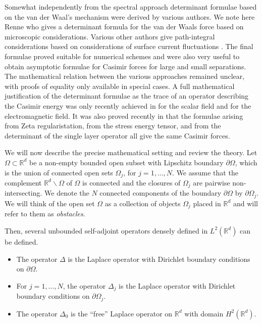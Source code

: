 Somewhat independently from the spectral approach determinant formulae based on the van der Waal's mechanism were derived by various authors. 
We note here Renne \cite{renne1971microscopic} who gives a determinant formula for the van der Waals force based on microscopic considerations. Various other authors 
give path-integral considerations based on considerations of surface current fluctuations 
\cite{bimonte2017nonequilibrium, emig2007casimir, emig2006casimir, EGJK2008, emig2008casimir, kenneth2006opposites, kenneth2008casimir, milton2008multiple, rahi2009scattering}. The final formulae proved suitable for numerical schemes 
and were also very useful to obtain asymptotic formulae for Casimir forces for large and small separations. The mathematical relation between the various 
approaches remained unclear, with proofs of equality only available in special cases.
A full mathematical justification of the determinant formulae as the trace of an operator describing the Casimir energy was only recently achieved in 
\cite{hanisch2020relative} for the scalar field and \cite{strohmaier2021classical} for the electromagnetic field. It was also proved recently in \cite{fang2021mathematical} that the 
formulae arising from Zeta regularistation, from the stress energy tensor, and from the determinant of the single layer operator all give the same Casimir forces.

We will now describe the precise mathematical setting and review the theory.
Let $\Omega \subset \mathbb{R}^{d}$ be a non-empty bounded open subset with Lipschitz boundary $\partial \Omega$, which is the union of connected open 
sets $\Omega_{j}$, for $j = 1, \dots, N$. We assume that the complement $\mathbb{R}^{d} \backslash \Omega$ of $\Omega$ is connected and the closures of $\Omega_{j}$ 
are pairwise non-intersecting.
We denote the  $N$ connected components of the boundary $\partial\Omega$ by $\partial\Omega_{j}$. 
We will think of the open set $\Omega$ as a collection of objects $\Omega_{j}$ placed in $\mathbb{R}^{d}$ and will refer to them as {\sl obstacles}.

Then, several unbounded self-adjoint operators densely defined in $L^{2}(\mathbb{R}^{d})$
can be defined.
\begin{itemize}
    \item The operator $\Delta$ is the Laplace operator with Dirichlet boundary conditions on $\partial\Omega$.
    \item For $j = 1, \dots, N$, the operator $\Delta_{j}$ is the Laplace operator with Dirichlet boundary conditions on $\partial\Omega_{j}$.
    \item The operator $\Delta_{0}$ is the ``free'' Laplace operator on $\mathbb{R}^{d}$ with domain $H^{2}(\mathbb{R}^{d})$.
\end{itemize}

